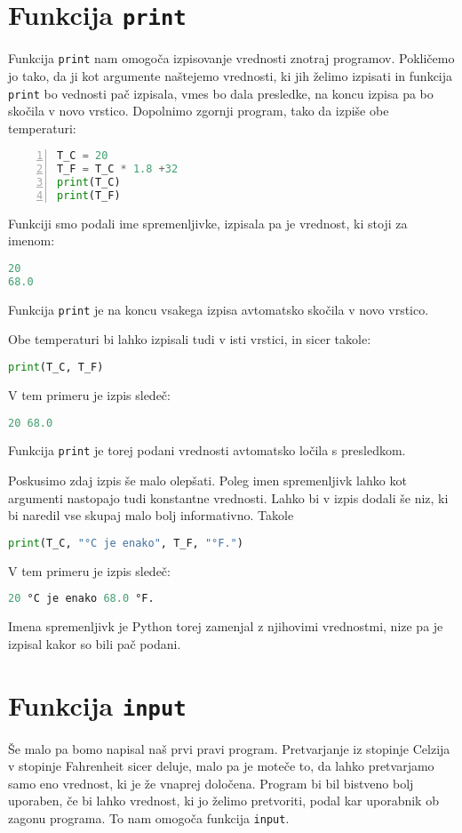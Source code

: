 \section{Funkcija \texttt{print}}
Funkcija \texttt{print} nam omogoča izpisovanje vrednosti znotraj programov. Pokličemo jo tako, da ji kot argumente naštejemo vrednosti, ki jih želimo izpisati in funkcija \texttt{print} bo vednosti pač izpisala, vmes bo dala presledke, na koncu izpisa pa bo skočila v novo vrstico. Dopolnimo zgornji program, tako da izpiše obe temperaturi:
\begin{lstlisting}[language=Python,numbers=left]
T_C = 20
T_F = T_C * 1.8 +32
print(T_C)
print(T_F)
\end{lstlisting}
Funkciji smo podali ime spremenljivke, izpisala pa je vrednost, ki stoji za imenom:
\begin{lstlisting}[language=Python]
20
68.0
\end{lstlisting}
Funkcija \texttt{print} je na koncu vsakega izpisa avtomatsko skočila v novo vrstico.

Obe temperaturi bi lahko izpisali tudi v isti vrstici, in sicer takole:
\begin{lstlisting}[language=Python]
print(T_C, T_F)
\end{lstlisting}
V tem primeru je izpis sledeč:
\begin{lstlisting}[language=Python]
20 68.0
\end{lstlisting}
Funkcija \texttt{print} je torej podani vrednosti avtomatsko ločila s presledkom. 

Poskusimo zdaj izpis še malo olepšati. Poleg imen spremenljivk lahko kot argumenti nastopajo tudi konstantne vrednosti. Lahko bi v izpis dodali še niz, ki bi naredil vse skupaj malo bolj informativno. Takole
\begin{lstlisting}[language=Python]
print(T_C, "°C je enako", T_F, "°F.")
\end{lstlisting}
V tem primeru je izpis sledeč:
\begin{lstlisting}[language=Python]
20 °C je enako 68.0 °F.
\end{lstlisting}
Imena spremenljivk je Python torej zamenjal z njihovimi vrednostmi, nize pa je izpisal kakor so bili pač podani.

\section{Funkcija \texttt{input}}
Še malo pa bomo napisal naš prvi pravi program. Pretvarjanje iz stopinje Celzija v stopinje Fahrenheit sicer deluje, malo pa je moteče to, da lahko pretvarjamo samo eno vrednost, ki je že vnaprej določena. Program bi bil bistveno bolj uporaben, če bi lahko vrednost, ki jo želimo pretvoriti, podal kar uporabnik ob zagonu programa. To nam omogoča funkcija \texttt{input}.

